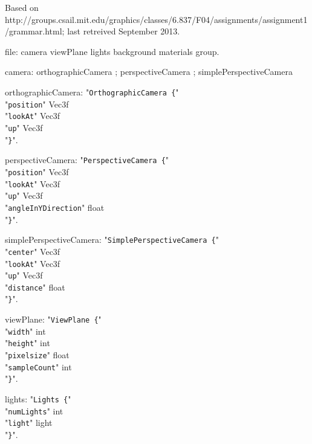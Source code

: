 \documentclass[twoside]{article}
\begin{document}
Based on\\ \small{http://groups.csail.mit.edu/graphics/classes/6.837/F04/assignments/assignment1/grammar.html}; last retreived September 2013.

\begin{grammar}
file: camera viewPlane lights background materials group.

camera: orthographicCamera ; perspectiveCamera ; simplePerspectiveCamera

orthographicCamera: "\verb!OrthographicCamera {!"\\
    "\verb!position!" Vec3f\\
    "\verb!lookAt!" Vec3f\\
    "\verb!up!" Vec3f\\
"\verb!}!".

perspectiveCamera: "\verb!PerspectiveCamera {!"\\
    "\verb!position!" Vec3f\\
    "\verb!lookAt!" Vec3f\\
    "\verb!up!" Vec3f\\
    "\verb!angleInYDirection!" float\\
"\verb!}!".

simplePerspectiveCamera: "\verb!SimplePerspectiveCamera {!"\\
    "\verb!center!" Vec3f\\
    "\verb!lookAt!" Vec3f\\
    "\verb!up!" Vec3f\\
    "\verb!distance!" float\\
"\verb!}!".

viewPlane: "\verb!ViewPlane {!"\\
    "\verb!width!" int\\
    "\verb!height!" int\\
    "\verb!pixelsize!" float\\
    "\verb!sampleCount!" int\\
"\verb!}!".

lights: "\verb!Lights {!"\\
    "\verb!numLights!" int\\
    "\verb!light!" light\\
"\verb!}!".


\end{grammar}
\end{document}
